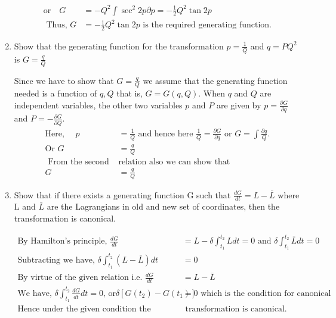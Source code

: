 \begin{enumerate}
\begin{answer}
\begin{align*}
		\text{or}\quad G&=-Q^{2} \int \sec ^{2} 2 p \partial p=-\frac{1}{2} Q^{2} \tan 2 p\\
	\text{	Thus, }G&=-\frac{1}{2} Q^{2} \tan 2 p\text{ is the required generating function.}
		\end{align*}
	\end{answer}
	\item Show that the generating function for the transformation $p=\frac{1}{Q}$ and $q=P Q^{2}$ is $G=\frac{q}{Q}$
	\begin{answer}
		 Since we have to show that $G=\frac{q}{Q}$ we assume that the generating function needed is a function of $q, Q$ that is, $G=G(q, Q)$. When $q$ and $Q$ are independent variables, the other two variables $p$ and $P$ are given by $p=\frac{\partial G}{\partial q}$ and $P=-\frac{\partial G}{\partial Q}$.
		\begin{align*}
		\text{Here, }\quad p&=\frac{1}{Q}\text{ and hence here }\frac{1}{Q}=\frac{\partial G}{\partial q}\text{ or }G=\int \frac{\partial q}{Q}.\\
		\text{Or }G&=\frac{q}{Q}\\
	\text{	From the second }&\text{relation also we can show that}\\
		G&=\frac{q}{Q}
		\end{align*}
	\end{answer}
	\item Show that if there exists a generating function $\mathrm{G}$ such that $\frac{d G}{d t}=L-\bar{L}$ where $\mathrm{L}$ and $\bar{L}$ are the Lagrangians in old and new set of coordinates, then the transformation is canonical.
	\begin{answer}
		\begin{align*}
		\text{By Hamilton's principle, }\frac{d G}{d t}&=L-\delta \int_{t_{1}}^{t_{2}} L d t=0\text{ and }\delta \int_{t_{1}}^{t_{2}} \bar{L} d t=0\\
		\text{Subtracting we have, }\delta \int_{t_{1}}^{t_{2}}(L-\bar{L}) d t&=0\\
		\text{By virtue of the given relation i.e. }\frac{d G}{d t}&=L-\bar{L}\\
		\text{We have, }\delta \int_{t_{1}}^{t_{2}} \frac{d G}{d t} d t=0\text{, or} \delta\left[G\left(t_{2}\right)-G\left(t_{1}\right)\right]&=0\text{ which is the condition for canonical transformation.}\\
		\text{Hence under the given condition the }&\text{ transformation is canonical.}
		\end{align*}
	\end{answer}

\end{enumerate}
